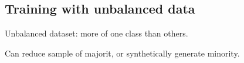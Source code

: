
\subsection{Training with unbalanced data}

Unbalanced dataset: more of one class than others.

Can reduce sample of majorit, or synthetically generate minority.

